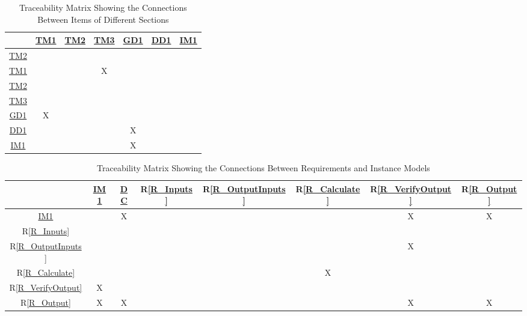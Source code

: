 \documentclass[12pt]{article}
\newcommand{\rref}[1]{R\ref{#1}}
\begin{document}
\begin{table}[h!]
  \centering
  \begin{tabular}{|c|c|c|c|c|c|c|}
  \hline        
  & \hyperref[TM:FWDKinematics]{TM1}
  & \hyperref[TM:SegmentCircleCollision]{TM2}
  & \hyperref[TM:AStarJointSpace]{TM3}
  & \hyperref[GD_AStar_DiscreteJointSpace]{GD1}
  & \hyperref[DD_EndEffectorPosition]{DD1}
  & \hyperref[IM:ArmPathPlanning]{IM1} \\
  \hline
  \hyperref[TM:SegmentCircleCollision]{TM2} & & & & & & \\ \hline
  \hyperref[TM:FWDKinematics]{TM1}         & & & X & & & \\ \hline
  \hyperref[TM:SegmentCircleCollision]{TM2} & & & & & & \\ \hline
  \hyperref[TM:AStarJointSpace]{TM3}       & & & & & & \\ \hline
  \hyperref[GD_AStar_DiscreteJointSpace]{GD1} & X & & & & & \\ \hline
  \hyperref[DD_EndEffectorPosition]{DD1}   & & & & X & & \\ \hline
  \hyperref[IM:ArmPathPlanning]{IM1}       & & & & X & & \\ \hline
  \end{tabular}
  \caption{Traceability Matrix Showing the Connections Between Items of Different Sections}
  \label{Table:trace}
\end{table}



\begin{table}[h!]
  \centering
  \begin{tabular}{|c|c|c|c|c|c|c|c|}
  \hline
  & \hyperref[IM:ArmPathPlanning]{IM1} 
  & \hyperref[sec_DataConstraints]{DC} 
  & \rref{R_Inputs} 
  & \rref{R_OutputInputs} 
  & \rref{R_Calculate} 
  & \rref{R_VerifyOutput} 
  & \rref{R_Output} \\
  \hline
  
  \hyperref[IM:ArmPathPlanning]{IM1} & 
       & X &   &   &   & X & X \\ 
  \hline

  \rref{R_Inputs} & 
       &   &   &   &   &   &   \\ 
  \hline

  \rref{R_OutputInputs} & 
       &   &   &   &   & X &   \\ 
  \hline

  \rref{R_Calculate} & 
       &   &   &   & X &   &   \\ 
  \hline

  \rref{R_VerifyOutput} & 
       X &   &   &   &   &   &   \\ 
  \hline

  \rref{R_Output} & 
       X & X &   &   &   & X & X \\ 
  \hline
  \end{tabular}
  \caption{Traceability Matrix Showing the Connections Between Requirements and Instance Models}
  \label{Table:R_trace}
\end{table}
\end{document}

